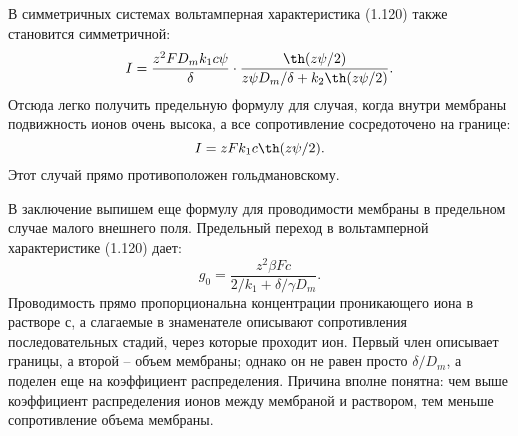 В симметричных системах вольтамперная характеристика (1.120) также становится
симметричной:
\begin{equation}
    I = \frac{z^2FD_mk_1c\psi}{\delta}\cdot
    \frac{\th(z\psi/2)}{z\psi D_m/\delta + k_2\th(z\psi/2)}.
\end{equation}
Отсюда легко получить предельную формулу для случая, когда внутри мембраны
подвижность ионов очень высока, а все сопротивление сосредоточено на границе:
\begin{equation}
    I = zFk_1 c \th(z\psi/2).
\end{equation}
Этот случай прямо противоположен гольдмановскому.

В заключение выпишем еще формулу для проводимости мембраны в предельном случае
малого внешнего поля. Предельный переход в вольтамперной характеристике (1.120)
дает:
\begin{equation}
    g_0 = \frac{z^2\beta Fc}{2/k_1 + \delta/\gamma D_m}.
\end{equation}
Проводимость прямо пропорциональна концентрации проникающего иона в растворе с,
а слагаемые в знаменателе описывают сопротивления последовательных стадий, через
которые проходит ион. Первый член описывает границы, а второй -- объем мембраны;
однако он не равен просто \( \delta/D_m \), а поделен еще на коэффициент
распределения. Причина вполне понятна: чем выше коэффициент распределения ионов
между мембраной и раствором, тем меньше сопротивление объема мембраны.

